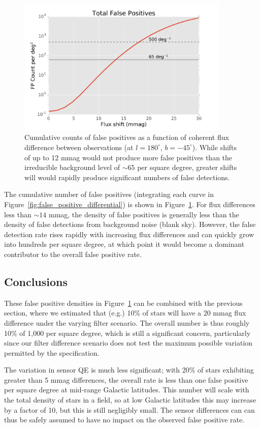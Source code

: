 \documentclass[12pt]{article}
\begin{document}
\begin{figure}
\includegraphics[width=0.9\textwidth]{figures/fp_vs_flux_shift.pdf}
\caption{Cumulative counts of false positives as a function of coherent flux
difference between observations (at $l=180^\circ$, $b=-45^\circ$).
While shifts of up to 12 mmag would not produce more false positives than the
irreducible background level of $\sim 65$ per square degree, greater shifts will
would rapidly produce significant numbers of false detections.
\label{fig:fp_vs_flux_shift}}
\end{figure}

The cumulative number of false positives (integrating each curve in
Figure~\ref{fig:false_positive_differential}) is shown in
Figure~\ref{fig:fp_vs_flux_shift}. For flux differences less than $\sim 14$
mmag, the density of false positives is generally less than the density of false
detections from background noise (blank sky). However, the false detection rate
rises rapidly with increasing flux differences and can quickly grow into
hundreds per square degree, at which point it would become a dominant
contributor to the overall false positive rate.

\subsection{Conclusions}

These false positive densities in Figure~\ref{fig:fp_vs_flux_shift} can be combined
with the previous section, where we estimated that (e.g.) 10\% of stars
will have a 20 mmag flux difference under the varying filter scenario. The
overall number is thus roughly 10\% of 1,000 per square degree, which is still a
significant concern, particularly since our filter difference scenario does not
test the maximum possible variation permitted by the specification.

The variation in sensor QE is much less significant; with 20\% of stars
exhibiting greater than 5 mmag differences, the overall rate is less than one
false positive per square degree at mid-range Galactic latitudes. This number
will scale with the total density of stars in a field, so at low Galactic
latitudes this may increase by a factor of 10, but this is still negligibly
small. The sensor differences can can thus be safely assumed to have no impact
on the observed false positive rate.
\end{document}
